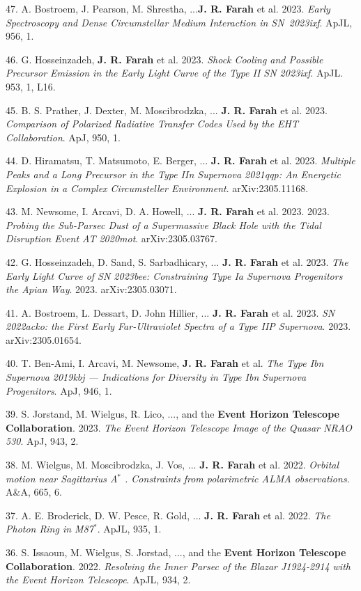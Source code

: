 \documentclass[margin,line]{res}
\begin{document}
\begin{resume}
47. A. Bostroem, J. Pearson, M. Shrestha, ...\textbf{J. R. Farah} et al. 2023. \textit{Early Spectroscopy and Dense Circumstellar Medium Interaction in SN~2023ixf}. ApJL, 956, 1.

46. G. Hosseinzadeh, \textbf{J. R. Farah} et al. 2023. \textit{Shock Cooling and Possible Precursor Emission in the Early Light Curve of the Type II SN 2023ixf}. ApJL. 953, 1, L16.  

45. B. S. Prather, J. Dexter, M. Moscibrodzka,  ... \textbf{J. R. Farah} et al. 2023. \textit{Comparison of Polarized Radiative Transfer Codes Used by the EHT Collaboration}. ApJ, 950, 1.

44. D. Hiramatsu, T. Matsumoto, E. Berger, ... \textbf{J. R. Farah} et al. 2023. \textit{Multiple Peaks and a Long Precursor in the Type IIn Supernova 2021qqp: An Energetic Explosion in a Complex Circumsteller Environment}. arXiv:2305.11168. 

43. M. Newsome, I. Arcavi, D. A. Howell, ... \textbf{J. R. Farah} et al. 2023. 2023.  \textit{Probing the Sub-Parsec Dust of a Supermassive Black Hole with the Tidal Disruption Event AT 2020mot}. arXiv:2305.03767.

42. G. Hosseinzadeh, D. Sand, S. Sarbadhicary, ... \textbf{J. R. Farah} et al. 2023. \textit{The Early Light Curve of SN 2023bee: Constraining Type Ia Supernova Progenitors the Apian Way}. 2023. arXiv:2305.03071. 

41. A. Bostroem, L. Dessart,  D. John Hillier, ... \textbf{J. R. Farah} et al. 2023. \textit{SN 2022acko: the First Early Far-Ultraviolet Spectra of a Type IIP Supernova}. 2023. arXiv:2305.01654.

40. T. Ben-Ami, I. Arcavi, M. Newsome, \textbf{J. R. Farah} et al. \textit{The Type Ibn Supernova 2019kbj --- Indications for Diversity in Type Ibn Supernova Progenitors}. ApJ, 946, 1.

39. S. Jorstand, M. Wielgus, R. Lico, ..., and the \textbf{Event Horizon Telescope Collaboration}. 2023. \textit{The Event Horizon Telescope Image of the Quasar NRAO 530}. ApJ, 943, 2.
 
38. M. Wielgus, M. Moscibrodzka, J. Vos, ... \textbf{J. R. Farah} et al. 2022. \textit{Orbital motion near Sagittarius A$^\ast$ . Constraints from polarimetric ALMA observations}. A\&A, 665, 6.

37. A. E. Broderick, D. W. Pesce, R. Gold, ... \textbf{J. R. Farah} et al. 2022. \textit{The Photon Ring in M87$^\ast$}. ApJL, 935, 1.

36. S. Issaoun, M. Wielgus, S. Jorstad, ..., and the \textbf{Event Horizon Telescope Collaboration}. 2022. \textit{Resolving the Inner Parsec of the Blazar J1924-2914 with the Event Horizon Telescope}. ApJL, 934, 2.


\end{resume}
\end{document}
